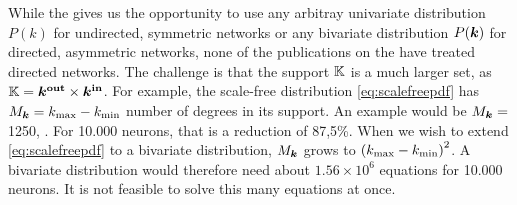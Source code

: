 While the \MFR gives us the opportunity to use any arbitray univariate distribution $P(k)$ for undirected, symmetric networks or any bivariate distribution $P({\boldsymbol{k}})$ for directed, asymmetric networks, none of the publications on the \MFR have treated directed networks. The challenge is that the support ${\mathbb{K}}$ is a much larger set, as ${\mathbb{K}} = \boldsymbol{{k^{\rm out}}} \times {\boldsymbol{k^{\rm in}}}$. For example, the scale-free distribution \eqref{eq:scalefreepdf} has $M_{{\boldsymbol{k}}} = k_{\text{max}} - k_{\text{min}}$ number of degrees in its support. An example would be $M_{{\boldsymbol{k}}} = $ 1250, \cite{OttAntonsen2017}. For 10.000 neurons, that is a reduction of 87,5\%. When we wish to extend \eqref{eq:scalefreepdf} to a bivariate distribution, $M_{{\boldsymbol{k}}}$ grows to $\left( \kmax - \kmin \right)^2$. A bivariate distribution would therefore need about $1.56 \times 10^6$ equations for 10.000 neurons. It is not feasible to solve this many equations at once.

